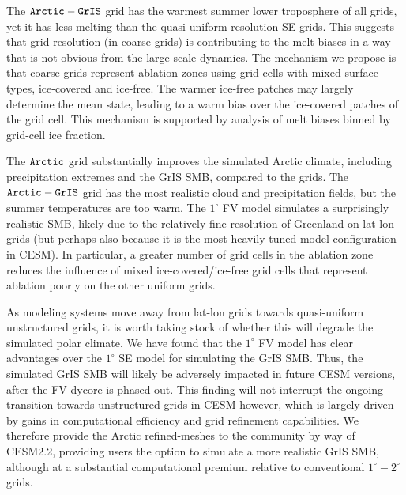 \documentclass[draft]{agujournal2019}
\begin{document}
The $\tt Arctic-GrIS$ grid has the warmest summer lower troposphere of all grids, yet it has less melting than the quasi-uniform resolution SE grids. This suggests that grid resolution (in coarse grids) is contributing to the melt biases in a way that is not obvious from the large-scale dynamics. The mechanism we propose is that coarse grids represent ablation zones using grid cells with mixed surface types, ice-covered and ice-free. The warmer ice-free patches may largely determine the mean state, leading to a warm bias over the ice-covered patches of the grid cell. This mechanism is supported by analysis of melt biases binned by grid-cell ice fraction. {\color{blue}{We leave further analysis of this hypothesis to future work.}}

The $\tt Arctic$ grid substantially improves the simulated Arctic climate, including precipitation extremes and the GrIS SMB, compared to the {} grids. The $\tt Arctic-GrIS$ grid has the most realistic cloud and precipitation fields, but the summer temperatures are too warm. The $1^{\circ}$ FV model simulates a surprisingly realistic SMB, likely due to the relatively fine resolution of Greenland on lat-lon grids (but perhaps also because it is the most heavily tuned model configuration in CESM). In particular, a greater number of grid cells in the ablation zone reduces the influence of mixed ice-covered/ice-free grid cells that represent ablation poorly on the other {\color{blue}{(coarser) lat-lon and quasi-}}uniform grids.

As modeling systems move away from lat-lon grids towards quasi-uniform unstructured grids, it is worth taking stock of whether this will degrade the simulated polar climate. We have found that the $1^{\circ}$ FV model has clear advantages over the $1^{\circ}$ SE model for simulating the GrIS SMB. {} Thus, the simulated GrIS SMB will likely be adversely impacted in future CESM versions, after the FV dycore is phased out. This finding will not interrupt the ongoing transition towards unstructured grids in CESM however, which is largely driven by gains in computational efficiency and grid refinement capabilities. We therefore provide the Arctic refined-meshes to the community by way of CESM2.2, providing users the option to simulate a more realistic GrIS SMB, although at a substantial computational premium relative to conventional $1^{\circ}-2^{\circ}$ grids.
\end{document}
